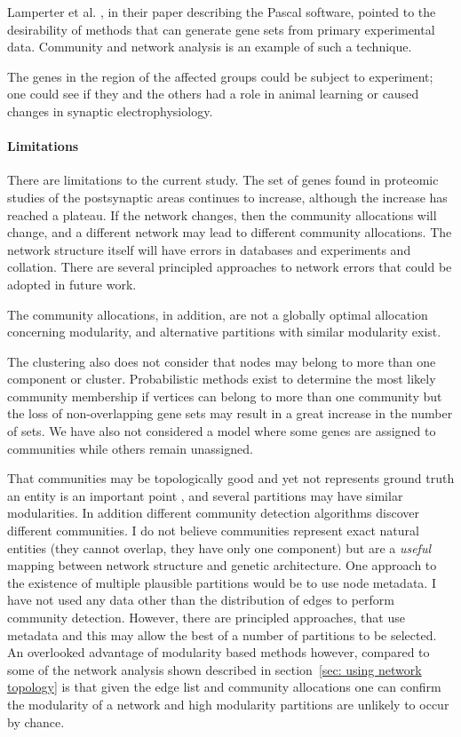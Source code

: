  Lamperter et al. \cite{lamparter2016fast}, in their paper describing the Pascal software, pointed to the desirability of methods that can generate gene sets from primary experimental data\cite{lamparter2016fast}. Community and network analysis is an example of such a technique.
 
 
The genes in the region of the affected groups could be subject to experiment; one could see if they and the others had a role in animal learning or caused changes in synaptic electrophysiology.
 
\paragraph{Limitations}
\label{sec:discussion window}
There are limitations to the current study. The set of genes found in proteomic studies of the postsynaptic areas continues to increase, although the increase has reached a plateau\cite{heil2018systems}. If the network changes, then the community allocations will change, and a different network may lead to different community allocations. The network structure itself will have errors in databases and experiments and collation. There are several principled approaches to network errors that could be adopted in future work\cite{newman2018networks}. 

The community allocations, in addition, are not a globally optimal allocation concerning modularity, and alternative partitions with similar modularity exist.

The clustering also does not consider that nodes may belong to more than one component or cluster. Probabilistic methods exist to determine the most likely community membership\cite{yang2013overlapping} if vertices can belong to more than one community but the loss of non-overlapping gene sets may result in a great increase in the number of sets. We have also not considered a model where some genes are assigned to communities while others remain unassigned.

That communities may be topologically good and yet not represents ground truth an entity is an important point \cite{peel2017ground},\cite{fortunato2016community} and several partitions may have similar modularities\cite{peel2017ground}. In addition different community detection algorithms discover different communities. I do not believe communities represent exact natural entities (they cannot overlap, they have only one component) but are a \textit{useful} mapping between network structure and genetic architecture. One approach to the existence of multiple plausible partitions would be to use node metadata. I have not used any data other than the distribution of edges to perform community detection. However, there are principled approaches\cite{newman2016structure},\cite{meng2018coupled} that use metadata and this may allow the best of a number of partitions to be selected. An overlooked advantage of modularity based methods however, compared to some of the network analysis shown described in section~\ref{sec: using network topology} is that given the edge list and community allocations one can confirm the modularity of a network and high modularity partitions are unlikely to occur by chance. 


